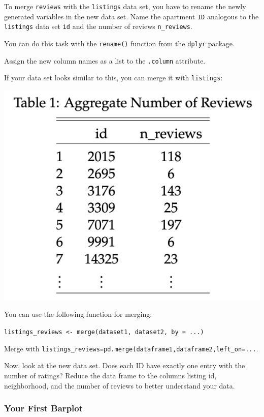 \documentclass[
  11pt,
]{article}
\newenvironment{tips}[1]
  {
  \begin{itemize}
  \footnotesize
  \renewcommand{\labelitemi}{
    \raisebox{-.7\height}[0pt][0pt]{
      {\setkeys{Gin}{width=3em,keepaspectratio}
        \texttt{[image: images/\#1.png]}}
    }
  }
  \setlength{\fboxsep}{1em}
  \begin{rbox}
  \item
  }
  {
  \end{rbox}
  \end{itemize}
  }
\newenvironment{tipsp}[1]
  {
  \begin{itemize}
  \footnotesize
  \renewcommand{\labelitemi}{
    \raisebox{-.7\height}[0pt][0pt]{
      {\setkeys{Gin}{width=3em,keepaspectratio}
        \texttt{[image: images/\#1.png]}}
    }
  }
  \setlength{\fboxsep}{1em}
  \begin{pbox}
  \item
  }
  {
  \end{pbox}
  \end{itemize}
  }
\begin{document}
To merge \texttt{reviews} with the \texttt{listings} data set, you have to rename the newly generated variables in the new data set.
Name the apartment \texttt{ID} analogous to the \texttt{listings} data set \texttt{id} and the number of reviews \texttt{n\_reviews}.

\begin{tips}r
You can do this task with the \texttt{rename()} function from the \texttt{dplyr} package.

\end{tips}

\begin{tipsp}p
Assign the new column names as a list to the \texttt{.column} attribute.

\end{tipsp}

If your data set looks similar to this, you can merge it with \texttt{listings}:

\begin{center}\includegraphics[width=0.4\linewidth]{plot/2_merging_table} \end{center}

\begin{tips}r
You can use the following function for merging:

\texttt{listings\_reviews\ \textless{}-\ merge(dataset1,\ dataset2,\ by\ =\ ...)}

\end{tips}

\begin{tipsp}p
Merge with \texttt{listings\_reviews=pd.merge(dataframe1,dataframe2,left\_on=...}.

\end{tipsp}

Now, look at the new data set.
Does each ID have exactly one entry with the number of ratings?
Reduce the data frame to the columns listing id, neighborhood, and the number of reviews to better understand your data.

\hypertarget{your-first-barplot}{%
\subsubsection{Your First Barplot}\label{your-first-barplot}}
\end{document}
